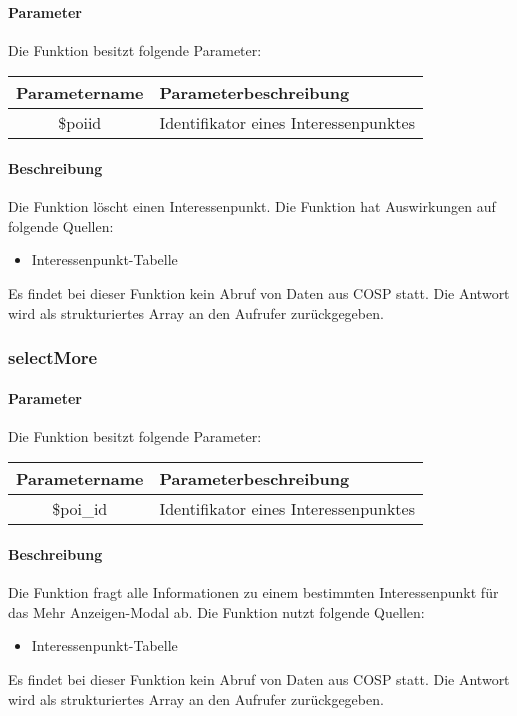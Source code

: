 \paragraph{Parameter} Die Funktion besitzt folgende Parameter:
\begin{table}[H]
	\begin{tabular}{|c|p{11cm}|}
		\hline
		\textbf{Parametername} & \textbf{Parameterbeschreibung} \\ \hline
		\$poiid & Identifikator eines Interessenpunktes \\ \hline
	\end{tabular}
\end{table}
\paragraph{Beschreibung} Die Funktion löscht einen Interessenpunkt. Die Funktion hat Auswirkungen auf folgende Quellen:
\begin{itemize}
	\item Interessenpunkt-Tabelle
\end{itemize}
Es findet bei dieser Funktion kein Abruf von Daten aus {\glqq COSP\grqq} statt. Die Antwort wird als strukturiertes Array an den Aufrufer zurückgegeben.
\subsubsection{selectMore}
\paragraph{Parameter} Die Funktion besitzt folgende Parameter:
\begin{table}[H]
	\begin{tabular}{|c|p{11cm}|}
		\hline
		\textbf{Parametername} & \textbf{Parameterbeschreibung} \\ \hline
		\$poi\_id & Identifikator eines Interessenpunktes \\ \hline
	\end{tabular}
\end{table}
\paragraph{Beschreibung} Die Funktion fragt alle Informationen zu einem bestimmten Interessenpunkt für das {\glqq Mehr Anzeigen\grqq}-Modal ab. Die Funktion nutzt folgende Quellen:
\begin{itemize}
	\item Interessenpunkt-Tabelle
\end{itemize}
Es findet bei dieser Funktion kein Abruf von Daten aus {\glqq COSP\grqq} statt. Die Antwort wird als strukturiertes Array an den Aufrufer zurückgegeben.
